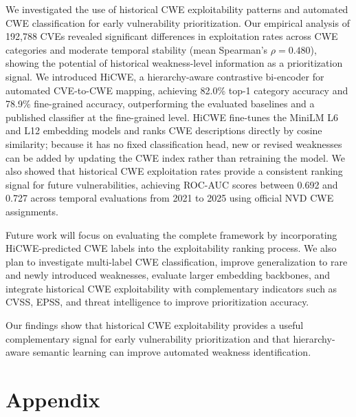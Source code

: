 \documentclass[conference,compsoc]{IEEEtran}
\begin{document}
We investigated the use of historical CWE exploitability patterns and automated CWE classification for early vulnerability prioritization. Our empirical analysis of 192,788 CVEs revealed significant differences in exploitation rates across CWE categories and moderate temporal stability (mean Spearman's $\rho=0.480$), showing the potential of historical weakness-level information as a prioritization signal. We introduced HiCWE, a hierarchy-aware contrastive bi-encoder for automated CVE-to-CWE mapping, achieving 82.0\% top-1 category accuracy and 78.9\% fine-grained accuracy, outperforming the evaluated baselines and a published classifier at the fine-grained level. HiCWE fine-tunes the MiniLM L6 and L12 embedding models and ranks CWE descriptions directly by cosine similarity; because it has no fixed classification head, new or revised weaknesses can be added by updating the CWE index rather than retraining the model. We also showed that historical CWE exploitation rates provide a consistent ranking signal for future vulnerabilities, achieving ROC-AUC scores between 0.692 and 0.727 across temporal evaluations from 2021 to 2025 using official NVD CWE assignments.

Future work will focus on evaluating the complete framework by incorporating HiCWE-predicted CWE labels into the exploitability ranking process. We also plan to investigate multi-label CWE classification, improve generalization to rare and newly introduced weaknesses, evaluate larger embedding backbones, and integrate historical CWE exploitability with complementary indicators such as CVSS, EPSS, and threat intelligence to improve prioritization accuracy.

Our findings show that historical CWE exploitability provides a useful complementary signal for early vulnerability prioritization and that hierarchy-aware semantic learning can improve automated weakness identification.



\clearpage



\clearpage
\section*{Appendix}
\end{document}
